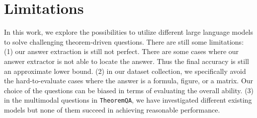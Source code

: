 \documentclass[11pt]{article}
\newcommand{\dataset}{\texttt{TheoremQA}\xspace}
\begin{document}
\section*{Limitations}
In this work, we explore the possibilities to utilize different large language models to solve challenging theorem-driven questions. There are still some limitations: (1) our answer extraction is still not perfect. There are some cases where our answer extractor is not able to locate the answer. Thus the final accuracy is still an approximate lower bound. (2) in our dataset collection, we specifically avoid the hard-to-evaluate cases where the answer is a formula, figure, or a matrix. Our choice of the questions can be biased in terms of evaluating the overall ability. (3) in the multimodal questions in \dataset, we have investigated different existing models but none of them succeed in achieving reasonable performance. 



\end{document}
